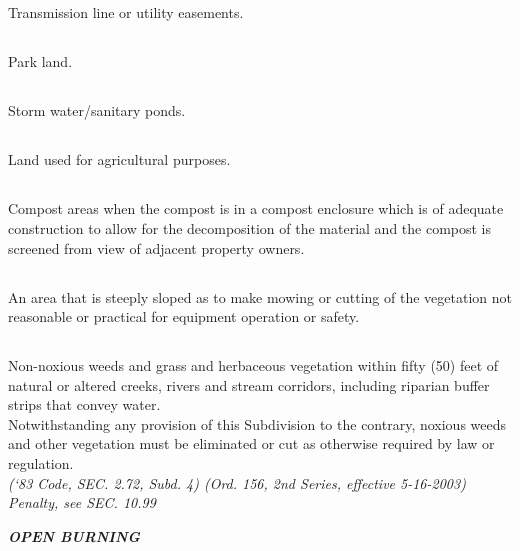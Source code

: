 \documentclass[code.tex]{subfiles}
\begin{document}
\subsection{}
Transmission line or utility easements.
\subsection{}
Park land.
\subsection{}
Storm water/sanitary ponds.
\subsection{}
Land used for agricultural purposes.
\subsection{}
Compost areas when the compost is in a compost enclosure which is of adequate construction to allow for the decomposition of the material and the compost is screened from view of adjacent property owners.
\subsection{}
An area that is steeply sloped as to make mowing or cutting of the vegetation not reasonable or practical for equipment operation or safety.
\subsection{}
Non-noxious weeds and grass and herbaceous vegetation within fifty (50) feet of natural or altered creeks, rivers and stream corridors, including riparian buffer strips that convey water.\\
Notwithstanding any provision of this Subdivision to the contrary, noxious weeds and other vegetation must be eliminated or cut as otherwise required by law or regulation.\\
\emph{(‘83 Code, SEC. 2.72, Subd. 4)  (Ord. 156, 2nd Series, effective 5-16-2003)  Penalty, see SEC. 10.99}

\begin{center}
\emph{\textbf{\LARGE{OPEN BURNING}}}
\end{center}
\setcounter{section}{59}
\end{document}
